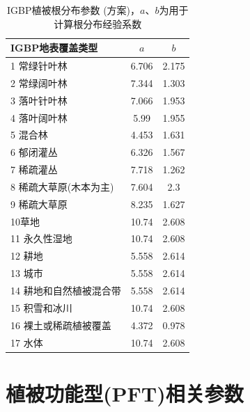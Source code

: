 \begin{table}[htbp]
\centering
\caption[IGBP植被根分布参数 (\citet{zeng2001global}方案)]{IGBP植被根分布参数 (\citet{zeng2001global}方案)，$a$、$b$为用于计算根分布经验系数}
\label{tab:IGBP植被根分布参数zeng方案}
\begin{tabular}{@{}lcc@{}}
\toprule
IGBP地表覆盖类型     & $a$ & $b$ \\ \midrule
 1 常绿针叶林      & 6.706           & 2.175 \\ 
 2 常绿阔叶林      & 7.344          & 1.303          \\
 3 落叶针叶林      & 7.066          & 1.953          \\
 4 落叶阔叶林      & 5.99           & 1.955          \\
 5 混合林        & 4.453          & 1.631          \\
 6 郁闭灌丛       & 6.326          & 1.567          \\
 7 稀疏灌丛       & 7.718          & 1.262          \\
 8 稀疏大草原(木本为主)& 7.604          & 2.3            \\
 9 稀疏大草原      & 8.235          & 1.627          \\
 10草地         & 10.74          & 2.608          \\
 11 永久性湿地     & 10.74          & 2.608          \\
 12 耕地        & 5.558          & 2.614          \\
 13 城市        & 5.558          & 2.614          \\
 14 耕地和自然植被混合带& 5.558          & 2.614          \\
 15 积雪和冰川     & 10.74          & 2.608          \\
 16 裸土或稀疏植被覆盖 & 4.372          & 0.978          \\
 17 水体          & 10.74          & 2.608          \\ \bottomrule
\end{tabular}
\end{table}


\chapter{植被功能型(PFT)相关参数}\label{植被功能型PFT相关参数}

